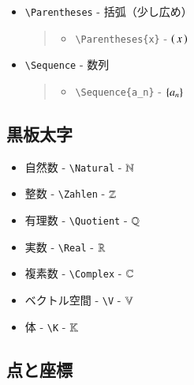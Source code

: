 \documentclass[oneside,10pt,a4paper]{jsarticle}
\begin{document}
\begin{itemize}
\begin{quote}
\begin{itemize}
        \end{itemize}
      \end{quote}
    \item \verb|\Parentheses| - 括弧（少し広め）
      \begin{quote}
        \Example
        \begin{itemize}
          \item \verb|\Parentheses{x}| - $\left( \, x \, \right)$
        \end{itemize}
      \end{quote}
    \item \verb|\Sequence| - 数列
      \begin{quote}
        \Example
        \begin{itemize}
          \item \verb|\Sequence{a_n}| - $\left\{ a_n \right\}$
        \end{itemize}
      \end{quote}
  \end{itemize}

  \newpage

  \subsection{黒板太字}

  \begin{itemize}
    \item 自然数 - \verb|\Natural| - $\mathbb{N}$
    \item 整数 - \verb|\Zahlen| - $\mathbb{Z}$
    \item 有理数 - \verb|\Quotient| - $\mathbb{Q}$
    \item 実数 - \verb|\Real| - $\mathbb{R}$
    \item 複素数 - \verb|\Complex| - $\mathbb{C}$
    \item ベクトル空間 - \verb|\V| - $\mathbb{V}$
    \item 体 - \verb|\K| - $\mathbb{K}$
  \end{itemize}

  \subsection{点と座標}
\end{document}
